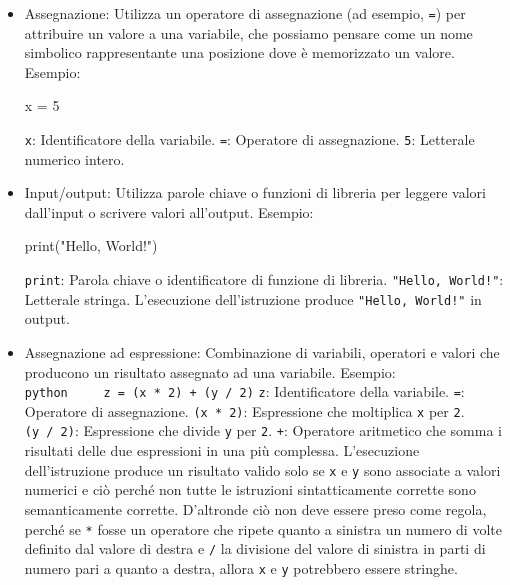 \documentclass[
  letterpaper,
]{scrbook}
\newenvironment{Shaded}{\begin{snugshade}}{\end{snugshade}}
\newcommand{\BuiltInTok}[1]{\textcolor[rgb]{0.00,0.23,0.31}{#1}}
\newcommand{\DecValTok}[1]{\textcolor[rgb]{0.68,0.00,0.00}{#1}}
\newcommand{\NormalTok}[1]{\textcolor[rgb]{0.00,0.23,0.31}{#1}}
\newcommand{\OperatorTok}[1]{\textcolor[rgb]{0.37,0.37,0.37}{#1}}
\newcommand{\StringTok}[1]{\textcolor[rgb]{0.13,0.47,0.30}{#1}}
\begin{document}
\begin{itemize}
\item
  Assegnazione: Utilizza un operatore di assegnazione (ad esempio,
  \texttt{=}) per attribuire un valore a una variabile, che possiamo
  pensare come un nome simbolico rappresentante una posizione dove è
  memorizzato un valore. Esempio:

\begin{Shaded}
\begin{Highlighting}[]
\NormalTok{x }\OperatorTok{=} \DecValTok{5}
\end{Highlighting}
\end{Shaded}

  \texttt{x}: Identificatore della variabile. \texttt{=}: Operatore di
  assegnazione. \texttt{5}: Letterale numerico intero.
\item
  Input/output: Utilizza parole chiave o funzioni di libreria per
  leggere valori dall'input o scrivere valori all'output. Esempio:

\begin{Shaded}
\begin{Highlighting}[]
\BuiltInTok{print}\NormalTok{(}\StringTok{"Hello, World!"}\NormalTok{)}
\end{Highlighting}
\end{Shaded}

  \texttt{print}: Parola chiave o identificatore di funzione di
  libreria. \texttt{"Hello,\ World!"}: Letterale stringa. L'esecuzione
  dell'istruzione produce \texttt{"Hello,\ World!"} in output.
\item
  Assegnazione ad espressione: Combinazione di variabili, operatori e
  valori che producono un risultato assegnato ad una variabile. Esempio:
  \texttt{python\ \ \ \ \ z\ =\ (x\ *\ 2)\ +\ (y\ /\ 2)} \texttt{z}:
  Identificatore della variabile. \texttt{=}: Operatore di assegnazione.
  \texttt{(x\ *\ 2)}: Espressione che moltiplica \texttt{x} per
  \texttt{2}. \texttt{(y\ /\ 2)}: Espressione che divide \texttt{y} per
  \texttt{2}. \texttt{+}: Operatore aritmetico che somma i risultati
  delle due espressioni in una più complessa. L'esecuzione
  dell'istruzione produce un risultato valido solo se \texttt{x} e
  \texttt{y} sono associate a valori numerici e ciò perché non tutte le
  istruzioni sintatticamente corrette sono semanticamente corrette.
  D'altronde ciò non deve essere preso come regola, perché se \texttt{*}
  fosse un operatore che ripete quanto a sinistra un numero di volte
  definito dal valore di destra e \texttt{/} la divisione del valore di
  sinistra in parti di numero pari a quanto a destra, allora \texttt{x}
  e \texttt{y} potrebbero essere stringhe.
\end{itemize}
\end{document}
